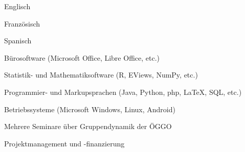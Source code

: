 


{\begin{cvenumerate}
		\item Englisch 
		\item Französisch 
		\item Spanisch 
	\end{cvenumerate}}

%

	{\begin{cvenumerate}
		\item Bürosoftware (Microsoft Office, Libre Office, etc.) 
		\item Statistik- und Mathematiksoftware (R, EViews, NumPy, etc.) 
		\item Programmier- und Markupsprachen (Java, Python, php, LaTeX, SQL, etc.) 
		\item Betriebssysteme (Microsoft Windows, Linux, Android) 
	\end{cvenumerate}}

	{\begin{cvenumerate}
		\item Mehrere Seminare über Gruppendynamik der ÖGGO
		\item Projektmanagement und -finanzierung
	\end{cvenumerate}}

